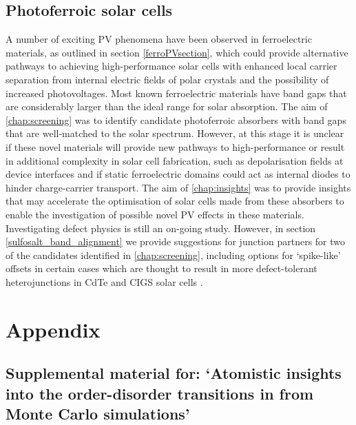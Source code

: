 \documentclass[11pt, twoside]{report}
\begin{document}
\section{Photoferroic solar cells}
A number of exciting PV phenomena have been observed in ferroelectric materials, as outlined in section \ref{ferroPVsection}, which could provide alternative pathways to achieving high-performance solar cells with enhanced local carrier separation from internal electric fields of polar crystals and the possibility of increased photovoltages. Most known ferroelectric materials have band gaps that are considerably larger than the ideal range for solar absorption. The aim of \autoref{chap:screening} was to identify candidate photoferroic absorbers with band gaps that are well-matched to the solar spectrum.
However, at this stage it is unclear if these novel materials will provide new pathways to high-performance or result in additional complexity in solar cell fabrication, such as depolarisation fields at device interfaces \cite{FE-PV_kirchartz} and if static ferroelectric domains could act as internal diodes to hinder charge-carrier transport. 
The aim of \autoref{chap:insights} was to provide insights that may accelerate the optimisation of solar cells made from these absorbers to enable the investigation of possible novel PV effects in these materials. Investigating defect physics is still an on-going study. However, in section \ref{sulfosalt_band_alignment} we provide suggestions for junction partners for two of the candidates identified in \autoref{chap:screening}, including options for `spike-like' offsets in certain cases which are thought to result in more defect-tolerant heterojunctions in CdTe and CIGS solar cells \cite{CdTe_spike, p-type_spike}.






\appendix
\chapter{Appendix}

\section{Supplemental material for: `Atomistic insights into the order-disorder transitions in {\CZTS} from Monte Carlo simulations'}\label{eris1_appendix}

\end{document}
